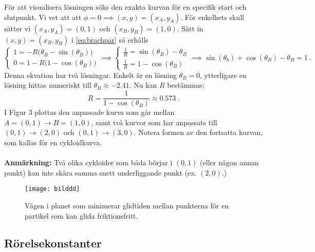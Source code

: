 \documentclass{article}
\begin{document}
För att visualisera lösningen söks den exakta kurvan för en specifik start och slutpunkt. Vi vet att att $\phi=0\implies (x,y)=(x_A,y_A).$ För enkelhets skull sätter vi $(x_A,y_A)=(0,1)$ och $(x_B,y_B)=(1,0)$. Sätt in $(x,y)=(x_B,y_B)$ i \eqref{eq:brachpar} så erhålls
\begin{equation*}
    \begin{cases}
    1=-R\big(\theta_B-\sin(\theta_B)\big)\\
    0=1-R\big(1-\cos(\theta_B)\big)
    \end{cases}\implies
    \begin{cases}
    \frac{1}{R}=\sin(\theta_B)-\theta_B\\
    \frac{1}{R}=1-\cos(\theta_B)
    \end{cases}\implies
    \sin(\theta_b)+\cos(\theta_B)-\theta_B=1 \ .
\end{equation*}
Denna ekvation har två lösningar. Enkelt är en lösning $\theta_B=0$, ytterligare en lösning hittas numeriskt till $\theta_B\approx -2.41$. Nu kan $R$ bestämmas:
$$
R=\frac{1}{1-\cos(\theta_B)}\approx 0.573 \ .
$$
I Figur 3 plottas den anpassade kurva som går mellan $A=(0,1)\rightarrow B=(1,0)$, samt två kurvor som har anpassats till $(0,1)\rightarrow (2,0)$ och $(0,1)\rightarrow (3,0)$. Notera formen av den fortsatta kurvan, som kallas för en cykloidkurva.\\ \\
\textbf{Anmärkning:} Två olika cykloider som båda börjar i $(0,1)$ (eller någon annan punkt) kan inte skära samma snett underliggande punkt (ex. $(2,0)$.)

\begin{figure}[H]
\begin{center} 
\texttt{[image: bilddd]}
\caption{Vägen i planet som minimerar glidtiden mellan punkterna för en partikel som kan glida friktionsfritt.}
\label{fig:fig1}
\end{center}
\end{figure}



\subsection{Rörelsekonstanter}
\end{document}
